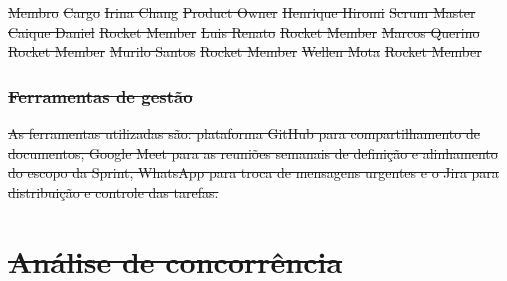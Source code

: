 \documentclass[
    12pt,               %
    openright,          %
    oneside,
    a4paper,            %
    BIBLATEX,           %
    TODO,               %
    english,            %
    brazil              %
    ]{ifsp-spo-inf-ctds}
\providecommand{\DIFdel}[1]{{\protect\color{red}\sout{#1}}}                      %
\begin{document}
\DIFdel{Membro }%
\DIFdel{Cargo }%
\DIFdel{Irina Chang }%
\DIFdel{Product Owner}%
\DIFdel{Henrique Hiromi }%
\DIFdel{Scrum Master}%
\DIFdel{Caique Daniel }%
\DIFdel{Rocket Member}%
\DIFdel{Luis Renato }%
\DIFdel{Rocket Member}%
\DIFdel{Marcos Querino }%
\DIFdel{Rocket Member}%
\DIFdel{Murilo Santos }%
\DIFdel{Rocket Member}%
\DIFdel{Wellen Mota }%
\DIFdel{Rocket Member}%

\subsection{\DIFdel{Ferramentas de gestão}}
\addtocounter{subsection}{-1}%
\DIFdel{As ferramentas utilizadas são: plataforma GitHub para compartilhamento de documentos, Google Meet para as reuniões semanais de definição e alinhamento do escopo da Sprint, WhatsApp para troca de mensagens urgentes e o Jira para distribuição e controle das tarefas. 
}%

\chapter{\DIFdel{Análise de concorrência}}
\addtocounter{chapter}{-1}%
\end{document}
